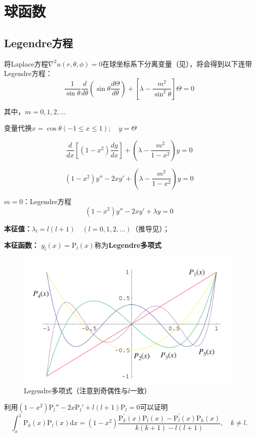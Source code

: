 \newpage
\section{球函数}
\subsection{Legendre方程}
\label{LegendreFunction}
将Laplace方程$\nabla^2u(r,\theta,\phi)=0$在球坐标系下分离变量（见），将会得到以下连带Legendre方程：
$$
\boxed{\frac{1}{\sin\theta}\frac{d}{d\theta}\left(\sin\theta\frac{d\Theta}{d\theta}\right)+\left[\lambda-\frac{m^2}{\sin^2\theta}\right]\Theta=0}
$$

其中，$m=0,1,2,\dots$

变量代换$x=\cos\theta(-1\le x\le1);\quad y=\Theta$

$$\frac{d}{dx}\left[(1-x^2)\frac{dy}{dx}\right]+\left(\lambda-\frac{m^2}{1-x^2}\right)y=0$$


$$\boxed{(1-x^2)y''-2xy'+\left(\lambda-\frac{m^2}{1-x^2}\right)y=0}$$

$m=0$：Legendre方程
$$
\boxed{(1-x^2)y''-2xy'+\lambda y=0}
$$

\textbf{本征值：}$\lambda_l=l(l+1)\quad(l=0,1,2,...)$（推导见）；

\textbf{本征函数：} $y_l(x)=\mathrm{P}_l(x)$称为\textbf{Legendre多项式}


\begin{figure}[H]
    \centering 
    \includegraphics[width=11cm]{figures/LegendrePolynomials.png} 
    \caption{Legendre多项式（注意到奇偶性与$l$一致）} 
    \label{LegendrePolynomials}
\end{figure}

利用$(1-x^2)\mathrm{P}_l''-2x\mathrm{P}_l'+l(l+1)\mathrm{P}_l=0$可以证明
$$\int_x^1\mathrm{P}_k(x)\mathrm{P}_l(x)\mathrm{d}x=\left(1-x^2\right)\frac{\mathrm{P}_k^{\prime}(x)\mathrm{P}_l(x)-\mathrm{P}_l^{\prime}(x)\mathrm{P}_k(x)}{k(k+1)-l(l+1)},\quad k\neq l.$$


